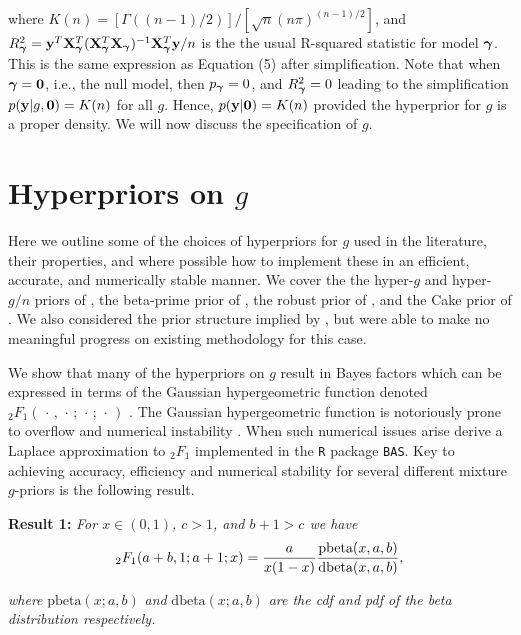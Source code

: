 \noindent where $K(n) = [\Gamma( (n-1)/2 )]/[\sqrt{n}(n\pi)^{(n-1)/2}]$, and
$R_{\boldsymbol \gamma}^2 =
{\bf y}^T{\bf X}_{\boldsymbol \gamma}^T({\bf X}_{\boldsymbol \gamma}^T{\bf X}_{\boldsymbol \gamma})^{-1}{\bf X}_{\boldsymbol \gamma}^T{\bf y}/n$ is the the
usual R-squared statistic for model ${\boldsymbol \gamma}$.  This is the same expression as
\cite{Liang2008} Equation (5) after simplification. Note that when ${\boldsymbol \gamma} =
{\bf 0}$, i.e., the null model, then $p_{\boldsymbol \gamma} = 0$, and $R_{\boldsymbol \gamma}^2 = 0$
leading to the simplification $p({\bf y}|g,{\bf 0}) = K(n)$ for all $g$. Hence,
$p({\bf y}|{\bf 0}) = K(n)$ provided the hyperprior for $g$ is a proper density. We
will now discuss the specification of $g$.


\section{Hyperpriors on $g$}
\label{sec:hyperpriors}

Here we outline some of the choices of hyperpriors for $g$ used in the
literature, their properties, and where possible how to implement these in an
efficient, accurate, and numerically stable manner. We cover the the hyper-$g$
and hyper-$g/n$ priors of \cite{Liang2008}, the beta-prime prior of
\cite{Maruyama2011}, the robust prior of \cite{Bayarri2012}, and the Cake prior
of \cite{OrmerodEtal2017}.  We also considered the prior structure implied by
\cite{Zellner1980}, but were able to make no meaningful progress on existing
methodology for this case.

We show that many of the hyperpriors on $g$ result in Bayes factors which can
be expressed in terms of the Gaussian hypergeometric function denoted
${}_2F_1(\,\cdot\,,\,\cdot\,;\,\cdot\,;\,\cdot\,)$ \citep[see for example
Chapter 15 of ][]{Abramowitz1972}.  The Gaussian hypergeometric function is
notoriously prone to overflow and numerical instability \citep{Pearson2017}.
When such numerical issues arise \cite{Liang2008} derive a Laplace
approximation to ${}_2F_1$ implemented in the {\tt R} package {\tt BAS}.  Key
to achieving accuracy, efficiency and numerical stability for several different
mixture $g$-priors is the following result.

\smallskip 
\noindent 
{\bf Result 1:} {\it For $x\in(0,1)$, $c>1$, and $b +1 > c$ we have}
\begin{equation}\label{eq:logGuassHypergeometric2}
	\displaystyle {}_2F_1(a+b,1;a+1;x) = \frac{a}{x(1 - x)}   \frac{\mbox{pbeta}(x,a,b)}{\mbox{dbeta}(x,a,b)},
\end{equation}

\noindent 
{\it where} $\mbox{pbeta}(x;a,b)$ {\it and} $\mbox{dbeta}(x;a,b)$ {\it are the cdf and pdf of the beta 
	distribution respectively.}

